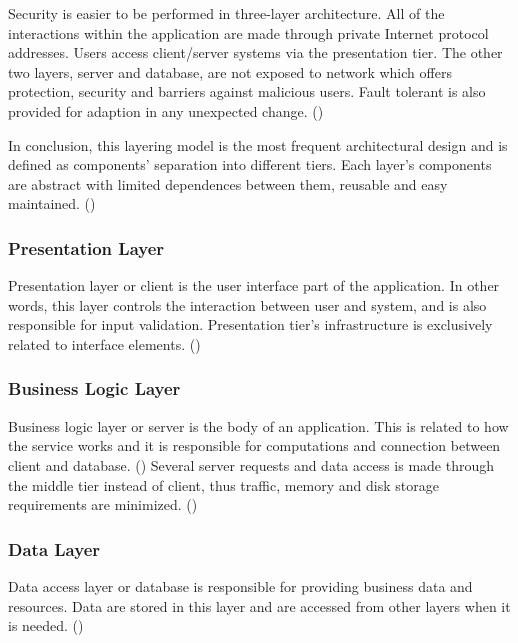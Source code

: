 Security is easier to be performed in three-layer architecture. All of the interactions within the application are made through private Internet protocol addresses. Users access client/server systems via the presentation tier. The other two layers, server and database, are not exposed to network which offers protection, security and barriers against malicious users. Fault tolerant is also provided for adaption in any unexpected change. (\cite{Reference2})\par

In conclusion, this layering model is the most frequent architectural design and is defined as components' separation into different tiers. Each layer's components are abstract with limited dependences between them, reusable and easy maintained. (\cite{Reference2}) \par

\subsubsection{Presentation Layer}
Presentation layer or client is the user interface part of the application. In other words, this layer controls the interaction between user and system, and is also responsible for input validation. Presentation tier's infrastructure is exclusively related to interface elements. (\cite{Reference2})\par

\subsubsection{Business Logic Layer}
Business logic layer or server is the body of an application. This is related to how the service works and it is responsible for computations and connection between client and database. (\cite{Reference2}) Several server requests and data access is made through the middle tier instead of client, thus traffic, memory and disk storage requirements are minimized. (\cite{Reference5})\par

\subsubsection{Data Layer}
Data access layer or database is responsible for providing business data and resources. Data are stored in this layer and are accessed from other layers when it is needed. (\cite{Reference2})\par


